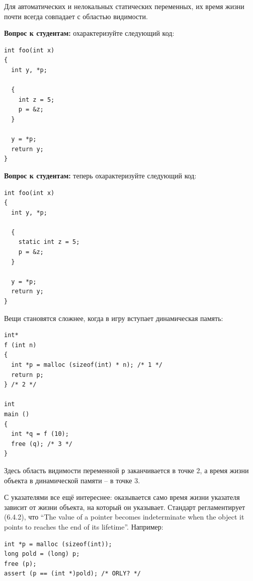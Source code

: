\documentclass[a4paper,12pt,oneside]{article}
\newif\ifanswers
\begin{document}
Для автоматических и нелокальных статических переменных, их время жизни почти всегда совпадает с областью видимости.

\textbf{Вопрос к студентам:} охарактеризуйте следующий код:

\begin{lstlisting}
int foo(int x) 
{
  int y, *p;

  {
    int z = 5; 
    p = &z;
  }

  y = *p;
  return y;
}
\end{lstlisting}

\ifanswers
Правильный ответ: этот код демонстрирует undefined behavior. В точке разыменования указателя истекло время жизни того, на что он указывает.
\fi

\textbf{Вопрос к студентам:} теперь охарактеризуйте следующий код:

\begin{lstlisting}
int foo(int x) 
{
  int y, *p;

  {
    static int z = 5; 
    p = &z;
  }

  y = *p;
  return y;
}
\end{lstlisting}

\ifanswers
Правильный ответ: здесь работает ещё одна перегруженная функция ключевого слова \lstinline!static! -- оно расширяет время жизни переменной до времени жизни программы. Таким образом здесь будет все хорошо -- переменная \lstinline!z! будет жить даже между вызовами функции.
\fi

Вещи становятся сложнее, когда в игру вступает динамическая память:

\begin{lstlisting}
int* 
f (int n) 
{
  int *p = malloc (sizeof(int) * n); /* 1 */
  return p;
} /* 2 */

int 
main () 
{
  int *q = f (10); 
  free (q); /* 3 */
}
\end{lstlisting}

Здесь область видимости переменной \lstinline!p! заканчивается в точке 2, а время жизни объекта в динамической памяти -- в точке 3.

С указателями все ещё интереснее: оказывается само время жизни указателя зависит от жизни объекта, на который он указывает. Стандарт регламентирует (6.4.2), что ``The value of a pointer becomes indeterminate when the object it points to reaches the end of its lifetime''. Например:

\begin{lstlisting}
int *p = malloc (sizeof(int));
long pold = (long) p;
free (p);
assert (p == (int *)pold); /* ORLY? */
\end{lstlisting}
\end{document}
